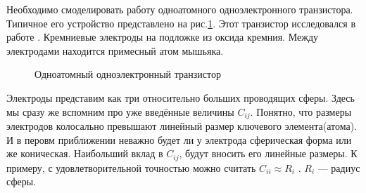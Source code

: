 \documentclass[12pt,a4paper]{report}
\begin{document}
Необходимо смоделировать работу  одноатомного одноэлектронного транзистора. Типичное его устройство представлено на рис.\ref{fig:SASET}. Этот транзистор исследовался в работе \cite{patriot}. Кремниевые электроды на подложке из оксида кремния. Между электродами находится примесный атом мышьяка. 
\begin{figure}[h]
	\caption{Одноатомный одноэлектронный транзистор}
	\label{fig:SASET}
\end{figure}
Электроды представим как три относительно больших проводящих сферы. Здесь мы сразу же вспомним про уже введённые величины $C_{ij}$. Понятно, что размеры электродов колосально превышают линейный размер ключевого элемента(атома). И в перовм приближении неважно будет ли у электрода сферическая форма или же коническая. Наибольший вклад в $C_{ij}$, будут вносить его линейные размеры. К примеру, с удовлетворительной точностью можно считать $C_{ii} \approx R_i$ . $R_i$ — радиус сферы.
\end{document}
